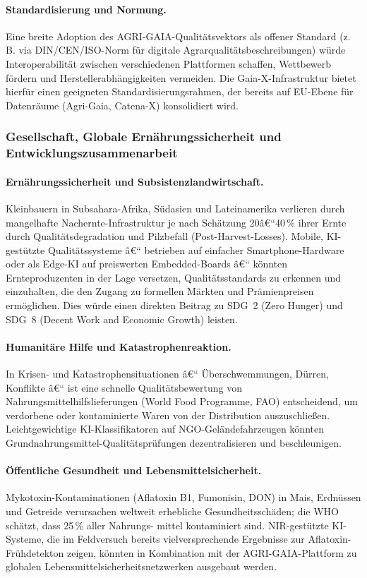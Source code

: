 ﻿\documentclass[12pt,a4paper]{article}
\theoremstyle{plain}
\theoremstyle{definition}
\begin{document}
	\paragraph{Standardisierung und Normung.}
	Eine breite Adoption des AGRI-GAIA-Qualitätsvek\-tors als offener
	Standard (z.\,B. via DIN/CEN/ISO-Norm für digitale Agrarqualitäts\-beschreibungen)
	würde Interoperabilität zwischen verschiedenen Plattformen schaffen,
	Wettbewerb fördern und Hersteller\-abhängigkeiten vermeiden.
	Die Gaia-X-Infrastruktur bietet hierfür einen geeigneten
	Standardisierungsrahmen, der bereits auf EU-Ebene für
	Datenräume (Agri-Gaia, Catena-X) konsolidiert wird.

	\subsubsection{Gesellschaft, Globale Ernährungssicherheit und Entwicklungszusammenarbeit}

	\paragraph{Ernährungssicherheit und Subsistenzlandwirtschaft.}
	Kleinbauern in Subsahara-Afrika, Südasien und Lateinamerika verlieren
	durch mangelhafte Nachernte-Infrastruktur je nach Schätzung
	20â€“40\,\% ihrer Ernte durch Qualitätsdegradation und Pilzbefall
	(Post-Harvest-Losses). Mobile, KI-gestützte Qualitätssysteme â€“
	betrieben auf einfacher Smart\-phone-Hardware oder als Edge-KI auf
	preiswerten Embedded-Boards â€“ könnten Ernteproduzenten in der
	Lage versetzen, Qualitätsstandards zu erkennen und einzuhalten,
	die den Zugang zu formellen Märkten und Prämienpreisen ermöglichen.
	Dies würde einen direkten Beitrag zu SDG~2 (Zero Hunger) und SDG~8
	(Decent Work and Economic Growth) leisten.

	\paragraph{Humanitäre Hilfe und Katastrophenreaktion.}
	In Krisen- und Katastrophensituationen â€“ Überschwemmungen, Dürren,
	Konflikte â€“ ist eine schnelle Qualitätsbewertung von
	Nahrungsmittelhilfslieferungen (World Food Programme, FAO)
	entscheidend, um verdorbene oder kontaminierte Waren von der
	Distribution auszuschließen. Leichtgewichtige KI-Klassifikatoren
	auf NGO-Geländefahrzeugen könnten Grundnahrungsmittel-Qualitätsprüfungen
	dezentralisieren und beschleunigen.

	\paragraph{Öffentliche Gesundheit und Lebensmittelsicherheit.}
	Mykotoxin-Kontaminationen (Aflatoxin B1, Fumonisin, DON) in Mais,
	Erdnüssen und Getreide verursachen weltweit erhebliche
	Gesundheitsschäden; die WHO schätzt, dass 25\,\% aller Nahrungs-
	mittel kontaminiert sind. NIR-gestützte KI-Systeme, die im
	Feldversuch bereits vielversprechende Ergebnisse zur
	Aflatoxin-Frühdetekton zeigen, könnten in Kombination mit der
	AGRI-GAIA-Plattform zu globalen Lebensmittelsicherheitsnetzwerken
	ausgebaut werden.
\end{document}
